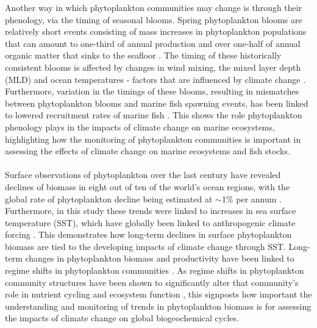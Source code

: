 \documentclass{article}
\begin{document}
\noindent
Another way in which phytoplankton communities may change is through their phenology, via the timing of seasonal blooms. Spring phytoplankton blooms are relatively short events consisting of mass increases in phytoplankton populations that can amount to one-third of annual production and over one-half of annual organic matter that sinks to the seafloor \citep{townsend_causes_1994}. The timing of these historically consistent blooms is affected by changes in wind mixing, the mixed layer depth (MLD) and ocean temperatures - factors that are influenced by climate change \citep{townsend_causes_1994,gittings_impacts_2018,sommer_climate_2008}. Furthermore, variation in the timings of these blooms, resulting in mismatches between phytoplankton blooms and marine fish spawning events, has been linked to lowered recruitment rates of marine fish \citep{asch_climate_2019}. This shows the role phytoplankton phenology plays in the impacts of climate change on marine ecosystems, highlighting how the monitoring of phytoplankton communities is important in assessing the effects of climate change on marine ecosystems and fish stocks.\\ \\
\noindent
Surface observations of phytoplankton over the last century have revealed declines of biomass in eight out of ten of the world’s ocean regions, with the global rate of phytoplankton decline being estimated at $\sim$1\% per annum \citep{boyce_global_2010}. Furthermore, in this study these trends were linked to increases in sea surface temperature (SST), which have globally been linked to anthropogenic climate forcing \citep{gittings_impacts_2018,boyce_global_2010,deser_twentieth_2010}. This demonstrates how long-term declines in surface phytoplankton biomass are tied to the developing impacts of climate change through SST. Long-term changes in phytoplankton biomass and productivity have been linked to regime shifts in phytoplankton communities \citep{mcquatters-gollop_long-term_2007}. As regime shifts in phytoplankton community structures have been shown to significantly alter that community’s role in nutrient cycling and ecosystem function \citep{mcmahon_millennial-scale_2015,brothers_regime_2013}, this signposts how important the understanding and monitoring of trends in phytoplankton biomass is for assessing the impacts of climate change on global biogeochemical cycles.\\ \\
\noindent
\end{document}
